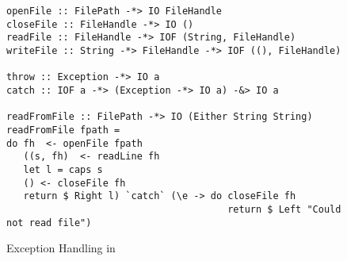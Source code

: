\begin{figure}[h]
  \begin{framed}
    \begin{verbatim}
openFile :: FilePath -*> IO FileHandle
closeFile :: FileHandle -*> IO ()
readFile :: FileHandle -*> IOF (String, FileHandle)
writeFile :: String -*> FileHandle -*> IOF ((), FileHandle)

throw :: Exception -*> IO a
catch :: IOF a -*> (Exception -*> IO a) -&> IO a

readFromFile :: FilePath -*> IO (Either String String)
readFromFile fpath =
do fh  <- openFile fpath
   ((s, fh)  <- readLine fh
   let l = caps s
   () <- closeFile fh
   return $ Right l) `catch` (\e -> do closeFile fh
                                       return $ Left "Could not read file")
    \end{verbatim}
  \end{framed}
  \caption{Exception Handling in \qub{}}
  \label{fig:qub-file-exceptions}
\end{figure}


